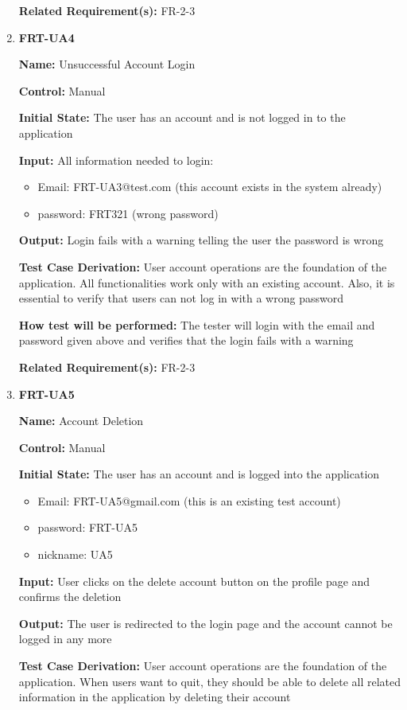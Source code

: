\documentclass[12pt, titlepage]{article}
\begin{document}
\begin{enumerate}
\textbf{Related Requirement(s):} FR-2-3

\item{\textbf{FRT-UA4}}

\textbf{Name:} Unsuccessful Account Login

\textbf{Control:} Manual
					
\textbf{Initial State:} The user has an account and is not logged in to the application

\textbf{Input:} All information needed to login:
\begin{itemize}
\item Email: FRT-UA3@test.com (this account exists in the system already)
\item password: FRT321 (wrong password)
\end{itemize}
					
\textbf{Output:} Login fails with a warning telling the user the password is wrong

\textbf{Test Case Derivation:} User account operations are the foundation of the application. All functionalities work only with an existing account. Also, it is essential to verify that users can not log in with a wrong password
					
\textbf{How test will be performed:} The tester will login with the email and password given above and verifies that the login fails with a warning

\textbf{Related Requirement(s):} FR-2-3

\item{\textbf{FRT-UA5}}

\textbf{Name:} Account Deletion

\textbf{Control:} Manual
					
\textbf{Initial State:} The user has an account and is logged into the application
\begin{itemize}
\item Email: FRT-UA5@gmail.com (this is an existing test account)
\item password: FRT-UA5
\item nickname: UA5
\end{itemize}

\textbf{Input:} User clicks on the delete account button on the profile page and confirms the deletion
					
\textbf{Output:} The user is redirected to the login page and the account cannot be logged in any more

\textbf{Test Case Derivation:} User account operations are the foundation of the application. When users want to quit, they should be able to delete all related information in the application by deleting their account
					

\end{enumerate}
\end{document}
